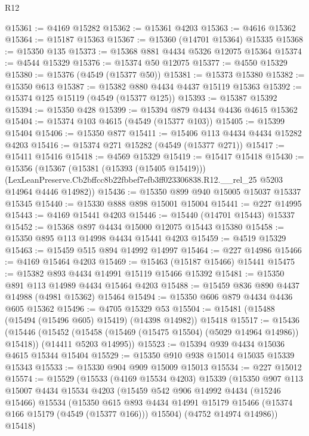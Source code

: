 \begin{lexlean}{R12}
\begin{coremodule}
@15361 := @4169 @15282
@15362 := @15361 @4203
@15363 := @4616 @15362
@15364 := @15187 @15363
@15367 := @15360 (@14701 @15364) @15335
@15368 := @15350 @135
@15373 := @15368 @881 @4434 @5326 @12075 @15364
@15374 := @4544 @15329
@15376 := @15374 @50 @12075
@15377 := @4550 @15329
@15380 := @15376 (@4549 (@15377 @50))
@15381 := @15373 @15380
@15382 := @15350 @613
@15387 := @15382 @880 @4434 @4437 @15119 @15363
@15392 := @15374 @125 @15119 (@4549 (@15377 @125))
@15393 := @15387 @15392
@15394 := @15350 @428
@15399 := @15394 @879 @4434 @4436 @4615 @15362
@15404 := @15374 @103 @4615 (@4549 (@15377 @103))
@15405 := @15399 @15404
@15406 := @15350 @877
@15411 := @15406 @113 @4434 @4434 @15282 @4203
@15416 := @15374 @271 @15282 (@4549 (@15377 @271))
@15417 := @15411 @15416
@15418 := @4569 @15329
@15419 := @15417 @15418
@15430 := @15356
    (@15367
      (@15381 (@15393 (@15405 @15419)))
      (LexLeanPreserve.Cb2bffcc8b22fbbef7efb3ff023306838.R12.__rel_25 @5203 @14964 @4446 @14982))
@15436 := @15350 @899 @940 @15005 @15037 @15337 @15345
@15440 := @15330 @888 @898 @15001 @15004
@15441 := @227 @14995
@15443 := @4169 @15441 @4203
@15446 := @15440 (@14701 @15443) @15337
@15452 := @15368 @897 @4434 @15000 @12075 @15443 @15380
@15458 := @15350 @895 @113 @14998 @4434 @15441 @4203
@15459 := @4519 @15329
@15463 := @15459 @515 @894 @14992 @14997
@15464 := @227 @14986
@15466 := @4169 @15464 @4203
@15469 := @15463 (@15187 @15466) @15441
@15475 := @15382 @893 @4434 @14991 @15119 @15466 @15392
@15481 := @15350 @891 @113 @14989 @4434 @15464 @4203
@15488 := @15459 @836 @890 @4437 @14988 (@4981 @15362) @15464
@15494 := @15350 @606 @879 @4434 @4436 @605 @15362
@15496 := @4705 @15329 @53
@15504 := @15481 (@15488 (@15494 (@15496 @605) @15419) (@14398 @14982)) @15418
@15517 := @15436
    (@15446
      (@15452 (@15458 (@15469 (@15475 @15504) (@5029 @14964 @14986)) @15418))
      (@14411 @5203 @14995))
@15523 := @15394 @939 @4434 @15036 @4615 @15344 @15404
@15529 := @15350 @910 @938 @15014 @15035 @15339 @15343
@15533 := @15330 @904 @909 @15009 @15013
@15534 := @227 @15012
@15574 := @15529
    (@15533
      (@4169 @15534 @4203)
      @15339
      (@15350
        @907
        @113
        @15007
        @4434
        @15534
        @4203
        (@15459
          @542
          @906
          @14992
          @4434
          (@15246 @15466)
          @15534
          (@15350
            @615
            @893
            @4434
            @14991
            @15179
            @15466
            (@15374 @166 @15179 (@4549 (@15377 @166)))
            @15504)
          (@4752 @14974 @14986))
        @15418)

\end{coremodule}
\end{lexlean}
